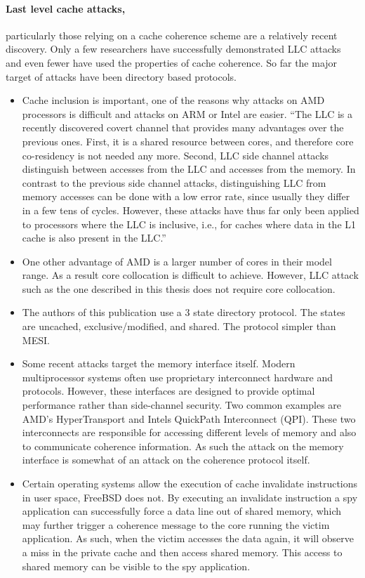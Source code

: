 	\paragraph{Last level cache attacks,} particularly those relying on a cache coherence scheme are a relatively recent discovery. Only a few researchers have successfully demonstrated LLC attacks and even fewer have used the properties of cache coherence. So far the major target of attacks have been directory based protocols. 
	\begin{itemize}
		\item Cache inclusion is important, one of the reasons why attacks on AMD processors is difficult and attacks on ARM or Intel are easier. ``The LLC is a recently discovered covert channel that provides many advantages over the previous ones. First, it is a shared resource between cores, and therefore core co-residency is not needed any more. Second, LLC side channel attacks distinguish between accesses from the LLC and accesses from the memory. In contrast to the previous side channel attacks, distinguishing LLC from memory accesses can be done with a low error rate, since usually they differ in a few tens of cycles. However, these attacks have thus far only been applied to processors where the LLC is inclusive, i.e., for caches where data in the L1 cache is also present
		in the LLC.''
		\item One other advantage of AMD is a larger number of cores in their model range. As a result core collocation is difficult to achieve. However, LLC attack such as the one described in this thesis does not require core collocation.
		\item The authors of this publication use a 3 state directory protocol. The states are uncached, exclusive/modified, and shared. The protocol simpler than MESI.
		\item Some recent attacks target the memory interface itself. Modern multiprocessor systems often use proprietary interconnect hardware and protocols. However, these interfaces are designed to provide optimal performance rather than side-channel security. Two common examples are AMD's HyperTransport and Intels QuickPath Interconnect (QPI). These two interconnects are responsible for accessing different levels of memory and also to communicate coherence information. As such the attack on the memory interface is somewhat of an attack on the coherence protocol itself.
		\item Certain operating systems allow the execution of cache invalidate instructions in user space, FreeBSD does not. By executing an invalidate instruction a spy application can successfully force a data line out of shared memory, which may further trigger a coherence message to the core running the victim application. As such, when the victim accesses the data again, it will observe a miss in the private cache and then access shared memory. This access to shared memory can be visible to the spy application.

\end{itemize}
